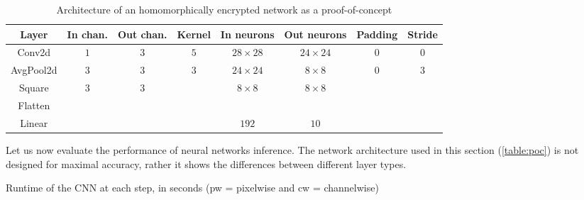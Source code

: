 \documentclass[a4paper,11pt,oneside]{report}
\begin{document}
\begin{table}[h!]
  \begin{center}
    \caption{Architecture of an homomorphically encrypted network as a proof-of-concept}
    \label{table:poc}
    \vspace*{2mm}
    \begin{tabular}{ c c c c c c c c }
    \hline
    Layer & In chan. & Out chan. & Kernel & In neurons & Out neurons & Padding & Stride \\
    \hline
    Conv2d & $1$ & $3$ & $5$ & $28 \times 28$ & $24 \times 24$ & $0$ & $0$ \\
    AvgPool2d & $3$ & $3$ & $3$ & $24 \times 24$ & $8 \times 8$ & $0$ & $3$ \\
    Square & $3$ & $3$ & & $8 \times 8$ & $8 \times 8$ &  &  \\
    Flatten \\
    Linear & & & & $192$ & $10$ & &  \\
    \hline
    \end{tabular}
  \end{center}
\end{table}

Let us now evaluate the performance of neural networks inference.
The network architecture used in this section (\autoref{table:poc}) is not designed for maximal accuracy, rather it shows the differences between different layer types.

\begin{table}[h!]
  \begin{center}
    \caption{Runtime of the CNN at each step, in seconds (pw = pixelwise and cw = channelwise)}
    \label{table:cnn_runtime}
    \vspace*{2mm}
  \end{center}
\end{table}
\end{document}
